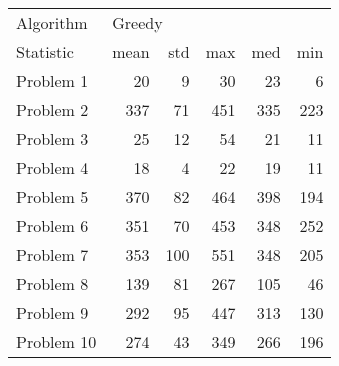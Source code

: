 \begin{tabular}{lrrrrr}
\toprule
Algorithm & \multicolumn{5}{l}{Greedy} \\
Statistic &   mean &  std &  max &  med &  min \\
\midrule
Problem 1  &     20 &    9 &   30 &   23 &    6 \\
Problem 2  &    337 &   71 &  451 &  335 &  223 \\
Problem 3  &     25 &   12 &   54 &   21 &   11 \\
Problem 4  &     18 &    4 &   22 &   19 &   11 \\
Problem 5  &    370 &   82 &  464 &  398 &  194 \\
Problem 6  &    351 &   70 &  453 &  348 &  252 \\
Problem 7  &    353 &  100 &  551 &  348 &  205 \\
Problem 8  &    139 &   81 &  267 &  105 &   46 \\
Problem 9  &    292 &   95 &  447 &  313 &  130 \\
Problem 10 &    274 &   43 &  349 &  266 &  196 \\
\bottomrule
\end{tabular}
